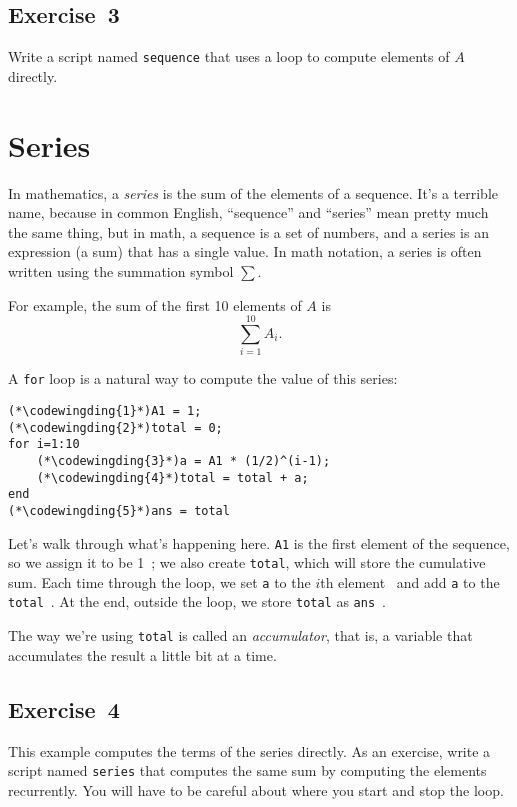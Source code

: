 \subsection{Exercise~3}
Write a script named \lstinline{sequence} that uses a loop to 
compute elements of $A$ directly.


\section{Series}
\label{series}

In mathematics, a \emph{series} is the sum of the elements of
a sequence.  It's a terrible name, because in common English,
``sequence'' and ``series'' mean pretty much the same thing, but in
math, a sequence is a set of numbers, and a series is an expression
(a sum) that has a single value.  In math notation, a series
is often written using the summation symbol $\sum$.


For example, the sum of the first 10 elements of $A$ is
\begin{equation*}
\sum_{i=1}^{10} A_i.
\end{equation*}

A \lstinline{for} loop is a natural way to compute the value of this series:

\begin{lstlisting}[caption={A program that calculates a simple series.}, label={lst:series_10}]
(*\codewingding{1}*)A1 = 1;
(*\codewingding{2}*)total = 0;
for i=1:10
    (*\codewingding{3}*)a = A1 * (1/2)^(i-1);
    (*\codewingding{4}*)total = total + a;
end
(*\codewingding{5}*)ans = total
\end{lstlisting}

Let's walk through what's happening here. \lstinline{A1} is the first element of the sequence, so we assign it to be 1~; we also create \lstinline{total}, which will store the cumulative sum.
Each time through the loop, we set \lstinline{a} to the $i$th element~ and add \lstinline{a} to the \lstinline{total}~.
At the end, outside the loop, we store \lstinline{total} as \lstinline{ans}~.

The way we're using \lstinline{total} is called an \emph{accumulator}, that is, a variable that accumulates the result a little bit at a time.  



\subsection{Exercise~4}
This example computes the terms of the series directly. As
an exercise, write a script named \lstinline{series} that computes
the same sum by computing the elements recurrently.  You will
have to be careful about where you start and stop the loop.


